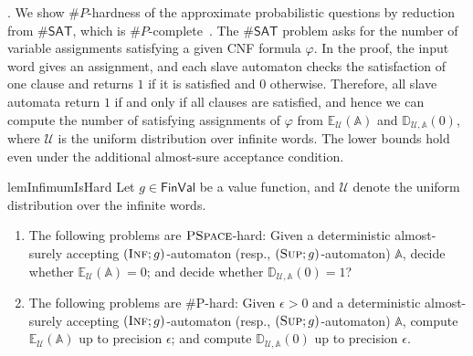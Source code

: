 \documentclass{lmcs}
\newcommand{\nestedA}{\mathbb{A}}
\newcommand{\PSPACE}{\textsc{PSpace}{}}
\newcommand{\fsup}{\textsc{Sup}}
\newcommand{\finf}{\textsc{Inf}}
\newcommand{\FinVal}{\mathsf{FinVal}}
\newcommand{\SAT}{\mathsf{SAT}}
\newcommand{\expected}{\mathbb{E}}
\newcommand{\distrib}{\mathbb{D}}
\newcommand{\calU}{\mathcal{U}}
\begin{document}
\smallskip{}.
We show $\#P$-hardness of the approximate probabilistic questions by reduction from
$\#\SAT$, which is $\#P$-complete~\cite{valiant1979complexity,papadimitriou2003computational}.
The $\#\SAT$ problem asks for the number of variable assignments satisfying a given CNF formula $\varphi$.
In the proof, the input word gives an assignment, and each slave automaton checks the satisfaction of one clause and returns $1$ if it is satisfied and $0$ otherwise.
Therefore, all slave automata return $1$ if and only if all clauses are satisfied, and hence
we can compute the number of satisfying assignments of $\varphi$ from $\expected_{\calU}(\nestedA)$ and $\distrib_{\calU, \nestedA}(0)$,
where $\calU$ is the uniform distribution over infinite words.
The lower bounds hold even under the additional almost-sure acceptance condition.

\begin{restatable}{lem}{InfimumIsHard}\label{l:hardness-for-det-inf}
Let $g \in \FinVal$ be a value function, and $\calU$ denote the uniform distribution over the infinite
words.
\begin{enumerate}
\item The following problems are $\PSPACE$-hard:
Given a deterministic almost-surely accepting $(\finf;g)$-automaton (resp., $(\fsup; g)$-automaton) $\nestedA$,
decide whether $\expected_{\calU}(\nestedA)=0$; and decide whether $\distrib_{\calU,\nestedA}(0)=1$?
\item The following problems are \#P-hard:  Given $\epsilon > 0$ and a deterministic almost-surely accepting $(\finf;g)$-automaton (resp., $(\fsup; g)$-automaton)
$\nestedA$, compute $\expected_{\calU}(\nestedA)$ up to precision $\epsilon$; and compute $\distrib_{\calU, \nestedA}(0)$ up to precision $\epsilon$.
\end{enumerate}
\end{restatable}
\end{document}
